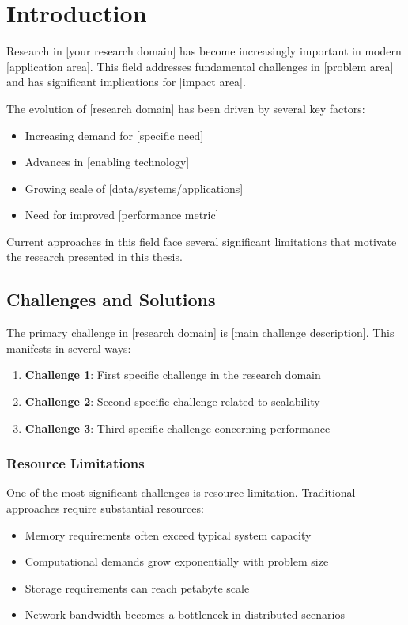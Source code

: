 \chapter{Introduction}
\label{chapter:introduction}

Research in [your research domain] has become increasingly important in modern [application area]. This field addresses fundamental challenges in [problem area] and has significant implications for [impact area]. \lipsum[1-2]

The evolution of [research domain] has been driven by several key factors:
\begin{itemize}
    \item Increasing demand for [specific need]
    \item Advances in [enabling technology]
    \item Growing scale of [data/systems/applications]
    \item Need for improved [performance metric]
\end{itemize}

Current approaches in this field face several significant limitations that motivate the research presented in this thesis.

\section{Challenges and Solutions}

The primary challenge in [research domain] is [main challenge description]. This manifests in several ways:
\begin{enumerate}
    \item \textbf{Challenge 1}: First specific challenge in the research domain
    \item \textbf{Challenge 2}: Second specific challenge related to scalability
    \item \textbf{Challenge 3}: Third specific challenge concerning performance
\end{enumerate}

\lipsum[3-4]

\subsection{Resource Limitations}

One of the most significant challenges is resource limitation. Traditional approaches require substantial resources:
\begin{itemize}
    \item Memory requirements often exceed typical system capacity
    \item Computational demands grow exponentially with problem size
    \item Storage requirements can reach petabyte scale
    \item Network bandwidth becomes a bottleneck in distributed scenarios
\end{itemize}

